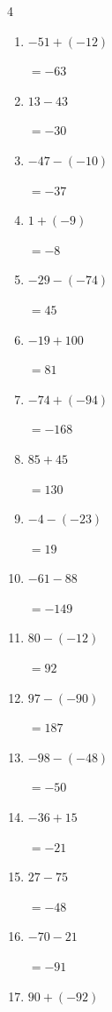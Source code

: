 \begin{multicols}{4}
\begin{enumerate}
\columnbreak %

  \item $-51+(-12)$

        $=-63$

  \item $13-43$

        $=-30$

  \item $-47-(-10)$

        $=-37$

  \item $1+(-9)$

        $=-8$

  \item $-29-(-74)$

        $=45$

  \item $-19+100$

        $=81$

  \item $-74+(-94)$

        $=-168$

  \item $85+45$

        $=130$

  \item $-4-(-23)$

        $=19$

  \item $-61-88$

        $=-149$

  \item $80-(-12)$

        $=92$

  \item $97-(-90)$

        $=187$

  \item $-98-(-48)$

        $=-50$

  \item $-36+15$

        $=-21$

  \item $27-75$

        $=-48$

  \item $-70-21$

        $=-91$

  \item $90+(-92)$


\end{enumerate}
\end{multicols}

